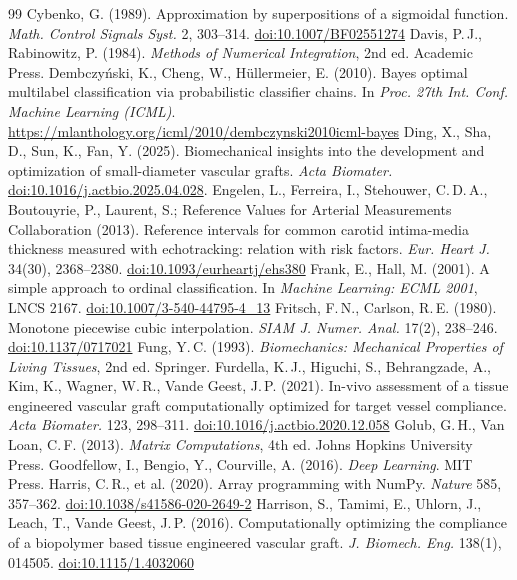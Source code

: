 \begin{thebibliography}{99}
 Cybenko, G. (1989). Approximation by superpositions of a sigmoidal function. \emph{Math. Control Signals Syst.} 2, 303--314. \href{https://doi.org/10.1007/BF02551274}{doi:10.1007/BF02551274}
 Davis, P.\,J., Rabinowitz, P. (1984). \emph{Methods of Numerical Integration}, 2nd ed. Academic Press.
 Dembczy\'nski, K., Cheng, W., Hüllermeier, E. (2010). Bayes optimal multilabel classification via probabilistic classifier chains. In \emph{Proc. 27th Int. Conf. Machine Learning (ICML)}. \url{https://mlanthology.org/icml/2010/dembczynski2010icml-bayes}
 Ding, X., Sha, D., Sun, K., Fan, Y. (2025). Biomechanical insights into the development and optimization of small-diameter vascular grafts. \emph{Acta Biomater.} \href{https://doi.org/10.1016/j.actbio.2025.04.028}{doi:10.1016/j.actbio.2025.04.028}.
 Engelen, L., Ferreira, I., Stehouwer, C.\,D.\,A., Boutouyrie, P., Laurent, S.; Reference Values for Arterial Measurements Collaboration (2013). Reference intervals for common carotid intima-media thickness measured with echotracking: relation with risk factors. \emph{Eur. Heart J.} 34(30), 2368--2380. \href{https://doi.org/10.1093/eurheartj/ehs380}{doi:10.1093/eurheartj/ehs380}
 Frank, E., Hall, M. (2001). A simple approach to ordinal classification. In \emph{Machine Learning: ECML 2001}, LNCS 2167. \href{https://doi.org/10.1007/3-540-44795-4_13}{doi:10.1007/3-540-44795-4\_13}
 Fritsch, F.\,N., Carlson, R.\,E. (1980). Monotone piecewise cubic interpolation. \emph{SIAM J. Numer. Anal.} 17(2), 238--246. \href{https://doi.org/10.1137/0717021}{doi:10.1137/0717021}
 Fung, Y.\,C. (1993). \emph{Biomechanics: Mechanical Properties of Living Tissues}, 2nd ed. Springer.
 Furdella, K.\,J., Higuchi, S., Behrangzade, A., Kim, K., Wagner, W.\,R., Vande Geest, J.\,P. (2021). In-vivo assessment of a tissue engineered vascular graft computationally optimized for target vessel compliance. \emph{Acta Biomater.} 123, 298--311. \href{https://doi.org/10.1016/j.actbio.2020.12.058}{doi:10.1016/j.actbio.2020.12.058}
 Golub, G.\,H., Van Loan, C.\,F. (2013). \emph{Matrix Computations}, 4th ed. Johns Hopkins University Press.
 Goodfellow, I., Bengio, Y., Courville, A. (2016). \emph{Deep Learning}. MIT Press.
 Harris, C.\,R., et al. (2020). Array programming with NumPy. \emph{Nature} 585, 357--362. \href{https://doi.org/10.1038/s41586-020-2649-2}{doi:10.1038/s41586-020-2649-2}
 Harrison, S., Tamimi, E., Uhlorn, J., Leach, T., Vande Geest, J.\,P. (2016). Computationally optimizing the compliance of a biopolymer based tissue engineered vascular graft. \emph{J. Biomech. Eng.} 138(1), 014505. \href{https://doi.org/10.1115/1.4032060}{doi:10.1115/1.4032060}

\end{thebibliography}
